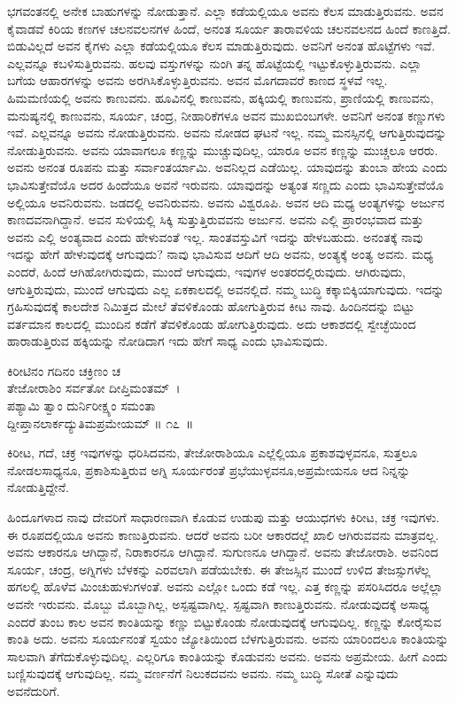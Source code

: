 ಭಗವಂತನಲ್ಲಿ ಅನೇಕ ಬಾಹುಗಳನ್ನು ನೋಡುತ್ತಾನೆ. ಎಲ್ಲಾ ಕಡೆಯಲ್ಲಿಯೂ ಅವನು ಕೆಲಸ ಮಾಡುತ್ತಿರುವನು. ಅವನ ಕೈವಾಡವೆ ಕಿರಿಯ ಕಣಗಳ ಚಲನವಲನಗಳ ಹಿಂದೆ, ಅನಂತ ಸೂರ್ಯ ತಾರಾವಳಿಯ ಚಲನವಲನದ ಹಿಂದೆ ಕಾಣತ್ತಿದೆ. ಬಿಡುವಿಲ್ಲದೆ ಅವನ ಕೈಗಳು ಎಲ್ಲಾ ಕಡೆಯಲ್ಲಿಯೂ ಕೆಲಸ ಮಾಡುತ್ತಿರುವುದು. ಅವನಿಗೆ ಅನಂತ ಹೊಟ್ಟೆಗಳು ಇವೆ. ಎಲ್ಲವನ್ನೂ ಕಬಳಿಸುತ್ತಿರುವನು. ಹಲವು ವಸ್ತುಗಳನ್ನು ನುಂಗಿ ತನ್ನ ಹೊಟ್ಟೆಯಲ್ಲಿ ಇಟ್ಟುಕೊಳ್ಳುತ್ತಿರುವನು. ಎಲ್ಲಾ ಬಗೆಯ ಆಹಾರಗಳನ್ನು ಅವನು ಅರಗಿಸಿಕೊಳ್ಳುತ್ತಿರುವನು. ಅವನ ಮೊಗದಾವರೆ ಕಾಣದ ಸ್ಥಳವೆ ಇಲ್ಲ. ಹಿಮಮಣಿಯಲ್ಲಿ ಅವನು ಕಾಣುವನು. ಹೂವಿನಲ್ಲಿ ಕಾಣುವನು, ಹಕ್ಕಿಯಲ್ಲಿ ಕಾಣುವನು, ಪ್ರಾಣಿಯಲ್ಲಿ ಕಾಣುವನು, ಮನುಷ್ಯನಲ್ಲಿ ಕಾಣುವನು, ಸೂರ್ಯ, ಚಂದ್ರ, ನೀಹಾರಿಕೆಗಳೂ ಅವನ ಮುಖಬಿಂಬಗಳೇ. ಅವನಿಗೆ ಅನಂತ ಕಣ್ಣುಗಳು ಇವೆ. ಎಲ್ಲವನ್ನೂ ಅವನು ನೋಡುತ್ತಿರುವನು. ಅವನು ನೋಡದ ಘಟನೆ ಇಲ್ಲ. ನಮ್ಮ ಮನಸ್ಸಿನಲ್ಲಿ ಆಗುತ್ತಿರುವುದನ್ನು ನೋಡುತ್ತಿರುವನು. ಅವನು ಯಾವಾಗಲೂ ಕಣ್ಣನ್ನು ಮುಚ್ಚುವುದಿಲ್ಲ, ಯಾರೂ ಅವನ ಕಣ್ಣನ್ನು ಮುಚ್ಚಲೂ ಆರರು. ಅವನು ಅನಂತ ರೂಪನು ಮತ್ತು ಸರ್ವಾಂತರ್ಯಾಮಿ. ಅವನಿಲ್ಲದ ಎಡೆಯಿಲ್ಲ. ಯಾವುದನ್ನು ತುಂಬಾ ಹೇಯ ಎಂದು ಭಾವಿಸುತ್ತೇವೆಯೊ ಅದರ ಹಿಂದೆಯೂ ಅವನೆ ಇರುವನು. ಯಾವುದನ್ನು ಅತ್ಯಂತ ಸಣ್ಣದು ಎಂದು ಭಾವಿಸುತ್ತೇವೆಯೊ ಅಲ್ಲಿಯೂ ಅವನಿರುವನು. ಜಡದಲ್ಲಿ ಅವನಿರುವನು. ಅವನು ವಿಶ್ವರೂಪಿ. ಅವನ ಆದಿ ಮಧ್ಯ ಅಂತ್ಯಗಳನ್ನು ಅರ್ಜುನ ಕಾಣದವನಾಗಿದ್ದಾನೆ. ಅವನ ಸುಳಿಯಲ್ಲಿ ಸಿಕ್ಕಿ ಸುತ್ತುತ್ತಿರುವವನು ಅರ್ಜುನ. ಅವನು ಎಲ್ಲಿ ಪ್ರಾರಂಭವಾದ ಮತ್ತು ಅವನು ಎಲ್ಲಿ ಅಂತ್ಯವಾದ ಎಂದು ಹೇಳುವಂತೆ ಇಲ್ಲ. ಸಾಂತವಸ್ತುವಿಗೆ ಇದನ್ನು ಹೇಳಬಹುದು. ಅನಂತಕ್ಕೆ ನಾವು ಇದನ್ನು ಹೇಗೆ ಹೇಳುವುದಕ್ಕೆ ಆಗುವುದು? ನಾವು ಭಾವಿಸುವ ಆದಿಗೆ ಆದಿ ಅವನು, ಅಂತ್ಯಕ್ಕೆ ಅಂತ್ಯ ಅವನು. ಮಧ್ಯ ಎಂದರೆ, ಹಿಂದೆ ಆಗಿಹೋಗಿರುವುದು, ಮುಂದೆ ಆಗುವುದು, ಇವುಗಳ ಅಂತರದಲ್ಲಿರುವುದು. ಆಗಿರುವುದು, ಆಗುತ್ತಿರುವುದು, ಮುಂದೆ ಆಗುವುದು ಎಲ್ಲ ಏಕಕಾಲದಲ್ಲಿ ಅವನಲ್ಲಿದೆ. ನಮ್ಮ ಬುದ್ಧಿ ಕಕ್ಕಾಬಿಕ್ಕಿಯಾಗುವುದು. ಇದನ್ನು ಗ್ರಹಿಸುವುದಕ್ಕೆ ಕಾಲದೇಶ ನಿಮಿತ್ತದ ಮೇಲೆ ತೆವಳಿಕೊಂಡು ಹೋಗುತ್ತಿರುವ ಕೀಟ ನಾವು. ಹಿಂದಿನದನ್ನು ಬಿಟ್ಟು ವರ್ತಮಾನ ಕಾಲದಲ್ಲಿ ಮುಂದಿನ ಕಡೆಗೆ ತೆವಳಿಕೊಂಡು ಹೋಗುತ್ತಿರುವುದು. ಅದು ಆಕಾಶದಲ್ಲಿ ಸ್ವೇಚ್ಛೆಯಿಂದ ಹಾರಾಡುತ್ತಿರುವ ಹಕ್ಕಿಯನ್ನು ನೋಡಿದಾಗ ಇದು ಹೇಗೆ ಸಾಧ್ಯ ಎಂದು ಭಾವಿಸುವುದು.

\begin{shloka}
ಕಿರೀಟಿನಂ ಗದಿನಂ ಚಕ್ರಿಣಂ ಚ\\ ತೇಜೋರಾಶಿಂ ಸರ್ವತೋ ದೀಪ್ತಿಮಂತಮ್~।\\ಪಶ್ಯಾಮಿ ತ್ವಾಂ ದುರ್ನಿರೀಕ್ಷ್ಯಂ ಸಮಂತಾ\\ ದ್ದೀಪ್ತಾನಲಾರ್ಕದ್ಯುತಿಮಪ್ರಮೇಯಮ್ \hfill॥ ೧೭~॥
\end{shloka}

\begin{artha}
ಕಿರೀಟ, ಗದೆ, ಚಕ್ರ ಇವುಗಳನ್ನು ಧರಿಸಿದವನು, ತೇಜೋರಾಶಿಯೂ ಎಲ್ಲೆಲ್ಲಿಯೂ ಪ್ರಕಾಶವುಳ್ಳ\-ವನೂ, ಸುತ್ತಲೂ ನೋಡಲಸಾಧ್ಯನೂ, ಪ್ರಕಾಶಿಸುತ್ತಿರುವ ಅಗ್ನಿ ಸೂರ್ಯರಂತೆ ಪ್ರಭೆಯುಳ್ಳವನೂ,\break ಅಪ್ರಮೇಯನೂ ಆದ ನಿನ್ನನ್ನು ನೋಡುತ್ತಿದ್ದೇನೆ.
\end{artha}

ಹಿಂದೂಗಳಾದ ನಾವು ದೇವರಿಗೆ ಸಾಧಾರಣವಾಗಿ ಕೊಡುವ ಉಡುಪು ಮತ್ತು ಆಯುಧಗಳು ಕಿರೀಟ, ಚಕ್ರ ಇವುಗಳು. ಈ ರೂಪದಲ್ಲಿಯೂ ಅವನು ಕಾಣುತ್ತಿರುವನು. ಆದರೆ ಅವನು ಬರೀ ಆಕಾರದಲ್ಲೆ ಖಾಲಿ ಆಗಿರುವವನು ಮಾತ್ರವಲ್ಲ. ಅವನು ಆಕಾರನೂ ಆಗಿದ್ದಾನೆ, ನಿರಾಕಾರನೂ ಆಗಿದ್ದಾನೆ. ಸುಗುಣನೂ ಆಗಿದ್ದಾನೆ. ಅವನು ತೇಜೋರಾಶಿ. ಅವನಿಂದ ಸೂರ್ಯ, ಚಂದ್ರ, ಅಗ್ನಿಗಳು ಬೆಳಕನ್ನು ಎರವಲಾಗಿ ಪಡೆಯಬೇಕು. ಈ ತೇಜಸ್ಸಿನ ಮುಂದೆ ಉಳಿದ ತೇಜಸ್ಸುಗಳೆಲ್ಲ ಹಗಲಲ್ಲಿ ಹೊಳೆವ ಮಿಂಚುಹುಳುಗಳಂತೆ. ಅವನು ಎಲ್ಲೋ ಒಂದು ಕಡೆ ಇಲ್ಲ. ಎತ್ತ ಕಣ್ಣನ್ನು ಪಸರಿಸಿದರೂ ಅಲ್ಲೆಲ್ಲಾ ಅವನೇ ಇರುವನು. ಮೊಬ್ಬು ಮೊಬ್ಬಾಗಿಲ್ಲ, ಅಸ್ಪಷ್ಟವಾಗಿಲ್ಲ. ಸ್ಪಷ್ಟವಾಗಿ ಕಾಣುತ್ತಿರುವನು. ನೋಡುವುದಕ್ಕೆ ಅಸಾಧ್ಯ ಎಂದರೆ ತುಂಬ ಕಾಲ ಅವನ ಕಾಂತಿಯನ್ನು ಕಣ್ಣು ಬಿಟ್ಟುಕೊಂಡು ನೋಡುವುದಕ್ಕೆ ಆಗುವುದಿಲ್ಲ. ಕಣ್ಣನ್ನು ಕೋರೈಸುವ ಕಾಂತಿ ಅದು. ಅವನು ಸೂರ್ಯನಂತೆ ಸ್ವಯಂ ಜ್ಯೋತಿಯಿಂದ ಬೆಳಗುತ್ತಿರುವನು. ಅವನು ಯಾರಿಂದಲೂ ಕಾಂತಿಯನ್ನು ಸಾಲವಾಗಿ ತೆಗೆದುಕೊಳ್ಳುವುದಿಲ್ಲ. ಎಲ್ಲರಿಗೂ ಕಾಂತಿಯನ್ನು ಕೊಡುವನು ಅವನು. ಅವನು ಅಪ್ರಮೇಯ. ಹೀಗೆ ಎಂದು ಬಣ್ಣಿಸುವುದಕ್ಕೆ ಆಗುವುದಿಲ್ಲ. ನಮ್ಮ ವರ್ಣನೆಗೆ ನಿಲುಕದವನು ಅವನು. ನಮ್ಮ ಬುದ್ಧಿ ಸೋತೆ ಎನ್ನುವುದು ಅವನೆದುರಿಗೆ.

